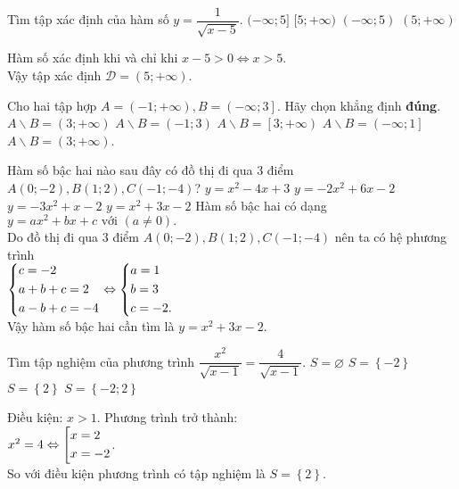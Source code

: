 \begin{ex}%
Tìm tập xác định của hàm số $y=\dfrac{1}{\sqrt{x-5}}$.
\choice
{$(-\infty ;5]$}
{$[5;+\infty )$ }
{$(-\infty ;5)$}
{\True $(5;+\infty )$}

	\loigiai
	{Hàm số xác định khi và chỉ khi $ x-5 > 0 \Leftrightarrow x > 5.$\\
		Vậy tập xác định $ \mathscr D = (5;+\infty) $.
	}
\end{ex}
\begin{ex}%
Cho hai tập hợp  $A=\left( -1;+\infty  \right),B=\left( -\infty ;3 \right]$. Hãy chọn khẳng định \textbf{đúng}.
\choice
{\True  $A\backslash B=\left( 3;+\infty  \right)$}
{$A\backslash B=\left( -1;3 \right)$}
{$A\backslash B=\left[ 3;+\infty  \right)$}
{$A\backslash B=\left( -\infty ;1 \right]$}
	\loigiai
	{$A\backslash B=\left( 3;+\infty  \right)$.
	}
\end{ex}
\begin{ex}%
Hàm số bậc hai nào sau đây có đồ thị đi qua 3 điểm  $A\left( 0;-2 \right),B\left( 1;2 \right),C\left( -1;-4 \right)$?
\choice
{$y={{x}^{2}}-4x+3$}
{$y=-2{{x}^{2}}+6x-2$}
{$y=-3{{x}^{2}}+x-2$}
{\True  $y={{x}^{2}}+3x-2$}
	\loigiai
	{Hàm số bậc hai có dạng $ y = ax^2 + bx +c \text{ với }(a \neq 0). $\\
	Do đồ thị đi qua 3 điểm $A\left( 0;-2 \right),B\left( 1;2 \right),C\left( -1;-4 \right)$ nên ta có hệ phương trình\\
	$ \left\{\begin{aligned}&c = -2\\ &a + b + c = 2\\&a - b + c = -4\end{aligned}\right. \Leftrightarrow \left\{\begin{aligned}&a = 1\\&b = 3\\&c = -2.\end{aligned}\right.  $	\\
	Vậy hàm số bậc hai cần tìm là $ y = x^2  + 3x - 2. $
	}
\end{ex}
\begin{ex}%
 Tìm tập nghiệm của phương trình  $\dfrac{x^2}{\sqrt{x-1}}=\dfrac{4}{\sqrt{x-1}}$.
\choice
{$S=\varnothing $}
{$S=\left\{ -2 \right\}$}
{\True  $S=\left\{ 2 \right\}$}
{$S=\left\{ -2;2 \right\}$ }
\loigiai
	{Điều kiện: $ x >1. $ Phương trình trở thành:\\
		$ x^2 =  4 \Leftrightarrow \left[\begin{aligned}&x = 2\\&x = -2\end{aligned}\right. $.\\
		So với điều kiện phương trình có tập nghiệm là $S=\left\{ 2 \right\}$.
		
	}
\end{ex}
